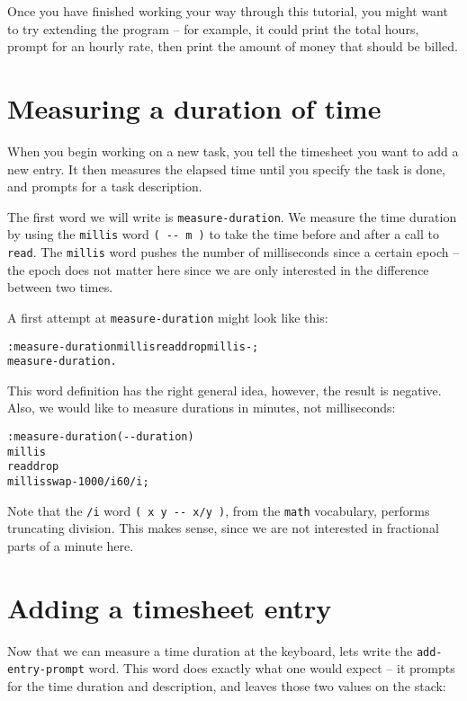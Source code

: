 \documentclass[english]{book}
\begin{document}
Once you have finished working your way through this tutorial, you might want to try extending the program -- for example, it could print the total hours, prompt for an hourly rate, then print the amount of money that should be billed.

\section{Measuring a duration of time}

When you begin working on a new task, you tell the timesheet you want
to add a new entry. It then measures the elapsed time until you specify
the task is done, and prompts for a task description.

The first word we will write is \texttt{measure-duration}. We measure
the time duration by using the \texttt{millis} word \texttt{( -{}-
m )} to take the time before and after a call to \texttt{read}. The
\texttt{millis} word pushes the number of milliseconds since a certain
epoch -- the epoch does not matter here since we are only interested
in the difference between two times.

A first attempt at \texttt{measure-duration} might look like this:

\begin{alltt}
: measure-duration millis read drop millis - ;
measure-duration .
\end{alltt}

This word definition has the right general idea, however, the result
is negative. Also, we would like to measure durations in minutes,
not milliseconds:

\begin{alltt}
: measure-duration ( -{}- duration )
    millis
    read drop
    millis swap - 1000 /i 60 /i ;
\end{alltt}

Note that the \texttt{/i} word \texttt{( x y -{}- x/y )}, from the
\texttt{math} vocabulary, performs truncating division. This
makes sense, since we are not interested in fractional parts of a
minute here.

\section{Adding a timesheet entry}

Now that we can measure a time duration at the keyboard, lets write
the \texttt{add-entry-prompt} word. This word does exactly what one
would expect -- it prompts for the time duration and description,
and leaves those two values on the stack:
\end{document}

